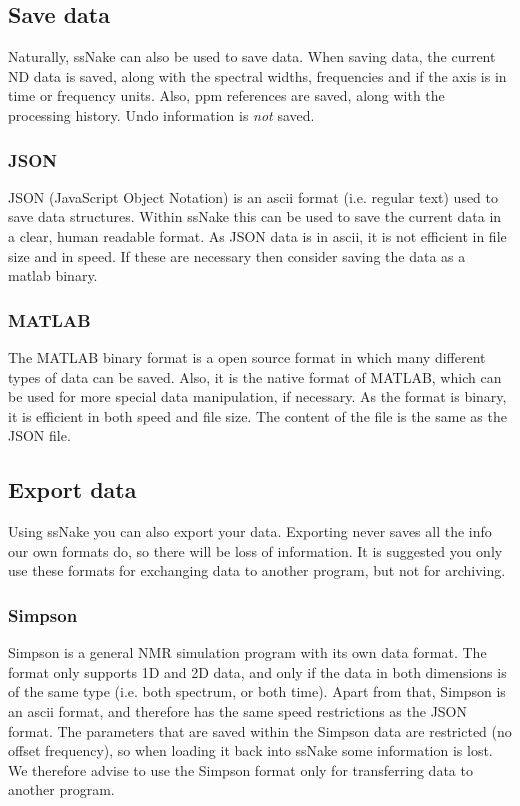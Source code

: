 \documentclass[11pt,a4paper]{article}
\begin{document}
\subsection{Save data}
Naturally, ssNake can also be used to save data. When saving data, the current ND data is saved, along with the spectral widths, frequencies and if the axis is in time or frequency units. Also, ppm references are saved, along with the processing history. Undo information is \textit{not} saved.

\subsubsection*{JSON}
JSON (JavaScript Object Notation) is an ascii format (i.e. regular text) used to save data structures. Within ssNake this can be used to save the current data in a clear, human readable format. As JSON data is in ascii, it is not efficient in file size and in speed. If these are necessary then consider saving the data as a matlab binary.

\subsubsection*{MATLAB}
The MATLAB binary format is a open source format in which many different types of data can be saved. Also, it is the native format of MATLAB, which can be used for more special data manipulation, if necessary. As the format is binary, it is efficient in both speed and file size. The content of the file is the same as the JSON file.


\subsection{Export data}
Using ssNake you can also export your data. Exporting never saves all the info our own formats do, so there will be loss of information. It is suggested you only use these formats for exchanging data to another program, but not for archiving.


\subsubsection*{Simpson}
Simpson is a general NMR simulation program with its own data format. The format only supports 1D and 2D data, and only if the data in both dimensions is of the same type (i.e. both spectrum, or both time). Apart from that, Simpson is an ascii format, and therefore has the same speed restrictions as the JSON format. The parameters that are saved within the Simpson data are restricted (no offset frequency), so when loading it back into ssNake some information is lost. We therefore advise to use the Simpson format only for transferring data to another program.
\end{document}

